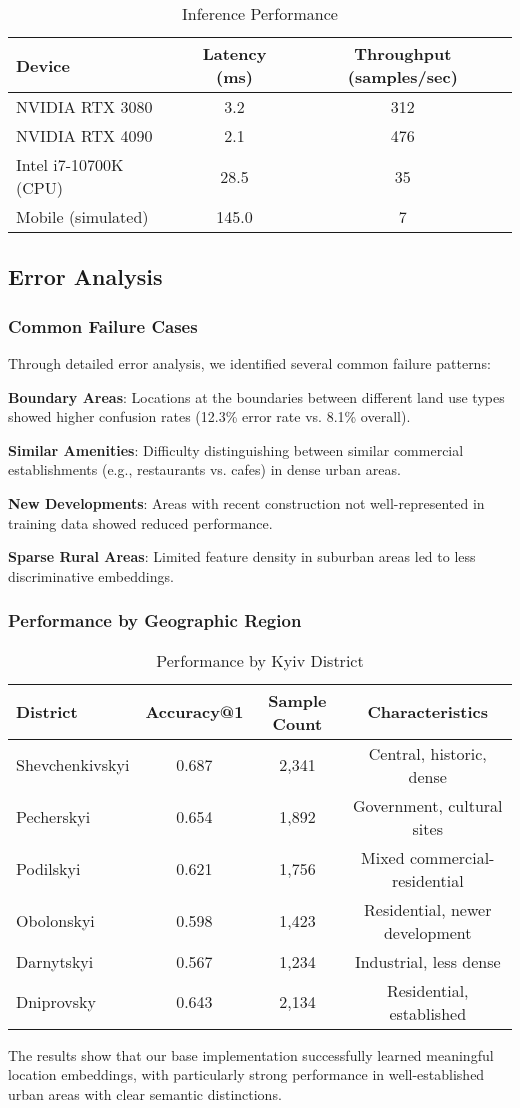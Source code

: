 \begin{table}[H]
\centering
\caption{Inference Performance}
\begin{tabular}{|l|c|c|}
\hline
\textbf{Device} & \textbf{Latency (ms)} & \textbf{Throughput (samples/sec)} \\
\hline
NVIDIA RTX 3080 & 3.2 & 312 \\
NVIDIA RTX 4090 & 2.1 & 476 \\
Intel i7-10700K (CPU) & 28.5 & 35 \\
Mobile (simulated) & 145.0 & 7 \\
\hline
\end{tabular}
\end{table}

\subsection{Error Analysis}

\subsubsection{Common Failure Cases}

Through detailed error analysis, we identified several common failure patterns:

\textbf{Boundary Areas}: Locations at the boundaries between different land use types showed higher confusion rates (12.3\% error rate vs. 8.1\% overall).

\textbf{Similar Amenities}: Difficulty distinguishing between similar commercial establishments (e.g., restaurants vs. cafes) in dense urban areas.

\textbf{New Developments}: Areas with recent construction not well-represented in training data showed reduced performance.

\textbf{Sparse Rural Areas}: Limited feature density in suburban areas led to less discriminative embeddings.

\subsubsection{Performance by Geographic Region}

\begin{table}[H]
\centering
\caption{Performance by Kyiv District}
\begin{tabular}{|l|c|c|c|}
\hline
\textbf{District} & \textbf{Accuracy@1} & \textbf{Sample Count} & \textbf{Characteristics} \\
\hline
Shevchenkivskyi & 0.687 & 2,341 & Central, historic, dense \\
Pecherskyi & 0.654 & 1,892 & Government, cultural sites \\
Podilskyi & 0.621 & 1,756 & Mixed commercial-residential \\
Obolonskyi & 0.598 & 1,423 & Residential, newer development \\
Darnytskyi & 0.567 & 1,234 & Industrial, less dense \\
Dniprovsky & 0.643 & 2,134 & Residential, established \\
\hline
\end{tabular}
\end{table}

The results show that our base implementation successfully learned meaningful location embeddings, with particularly strong performance in well-established urban areas with clear semantic distinctions.
